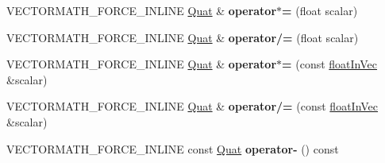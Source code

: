 \begin{DoxyCompactItemize}
\item 
\mbox{\label{classVectormath_1_1Aos_1_1Quat_a5022b6c946c23c00c94e35be02301856}} 
V\+E\+C\+T\+O\+R\+M\+A\+T\+H\+\_\+\+F\+O\+R\+C\+E\+\_\+\+I\+N\+L\+I\+NE \hyperlink{classVectormath_1_1Aos_1_1Quat}{Quat} \& {\bfseries operator$\ast$=} (float scalar)
\item 
\mbox{\label{classVectormath_1_1Aos_1_1Quat_aee82a492d22d88c0a241fe3fbcc4ad16}} 
V\+E\+C\+T\+O\+R\+M\+A\+T\+H\+\_\+\+F\+O\+R\+C\+E\+\_\+\+I\+N\+L\+I\+NE \hyperlink{classVectormath_1_1Aos_1_1Quat}{Quat} \& {\bfseries operator/=} (float scalar)
\item 
\mbox{\label{classVectormath_1_1Aos_1_1Quat_aac85298025da8b80e8296d16a9a27605}} 
V\+E\+C\+T\+O\+R\+M\+A\+T\+H\+\_\+\+F\+O\+R\+C\+E\+\_\+\+I\+N\+L\+I\+NE \hyperlink{classVectormath_1_1Aos_1_1Quat}{Quat} \& {\bfseries operator$\ast$=} (const \hyperlink{classVectormath_1_1floatInVec}{float\+In\+Vec} \&scalar)
\item 
\mbox{\label{classVectormath_1_1Aos_1_1Quat_a53da4e719e3b19e1a992e1e16cd2761c}} 
V\+E\+C\+T\+O\+R\+M\+A\+T\+H\+\_\+\+F\+O\+R\+C\+E\+\_\+\+I\+N\+L\+I\+NE \hyperlink{classVectormath_1_1Aos_1_1Quat}{Quat} \& {\bfseries operator/=} (const \hyperlink{classVectormath_1_1floatInVec}{float\+In\+Vec} \&scalar)
\item 
\mbox{\label{classVectormath_1_1Aos_1_1Quat_a6fd9ec8cbfe3cb15d6139da9b5dd1913}} 
V\+E\+C\+T\+O\+R\+M\+A\+T\+H\+\_\+\+F\+O\+R\+C\+E\+\_\+\+I\+N\+L\+I\+NE const \hyperlink{classVectormath_1_1Aos_1_1Quat}{Quat} {\bfseries operator-\/} () const
\end{DoxyCompactItemize}
